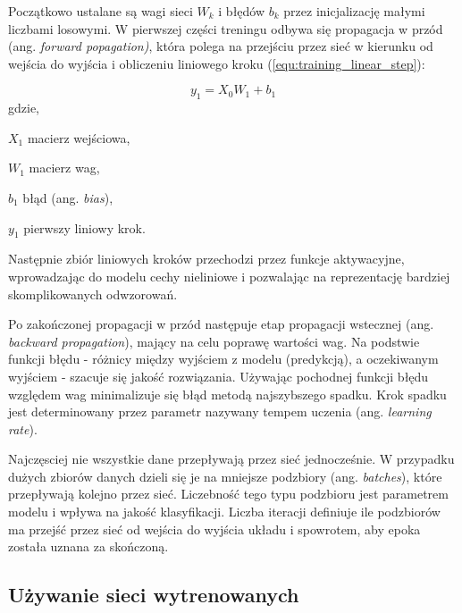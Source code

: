 {\parindent0pt %
Początkowo ustalane są wagi sieci $W_k$ i błędów $b_k$ przez inicjalizację małymi liczbami losowymi. W pierwszej części treningu odbywa się propagacja w przód (ang. \textit{forward popagation)}, która polega na przejściu przez sieć w kierunku od wejścia do wyjścia i obliczeniu liniowego kroku (\ref{equ:training_linear_step}):

\begin{equation}
y_1 = X_0 W_1 + b_1
\label{equ:training_linear_step}
\end{equation}
gdzie,
\begin{eqwhere}[2cm]
	\item[$X_1$] macierz wejściowa,
	\item[$W_1$] macierz wag,
	\item[$b_1$] błąd (ang. \textit{bias}),
	\item[$y_1$] pierwszy liniowy krok.
\end{eqwhere}

Następnie zbiór liniowych kroków przechodzi przez funkcje aktywacyjne, wprowadzając do modelu cechy nieliniowe i pozwalając na reprezentację bardziej skomplikowanych odwzorowań.

Po zakończonej propagacji w przód następuje etap propagacji wstecznej (ang. \textit{backward propagation}), mający na celu poprawę wartości wag. Na podstwie funkcji błędu - różnicy między wyjściem z modelu (predykcją), a oczekiwanym wyjściem - szacuje się jakość rozwiązania. Używając pochodnej funkcji błędu względem wag minimalizuje się błąd metodą najszybszego spadku. Krok spadku jest determinowany przez parametr nazywany tempem uczenia (ang. \textit{learning rate}). 

Najczęsciej nie wszystkie dane przepływają przez sieć jednocześnie. W przypadku dużych zbiorów danych dzieli się je na mniejsze podzbiory (ang. \textit{batches}), które przepływają kolejno przez sieć. Liczebność tego typu podzbioru jest parametrem modelu i wpływa na jakość klasyfikacji. Liczba iteracji definiuje ile podzbiorów ma przejść przez sieć od wejścia do wyjścia układu i spowrotem, aby epoka została uznana za skończoną. 
}

\subsection{Używanie sieci wytrenowanych}

